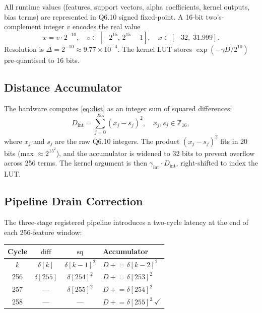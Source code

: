 \documentclass[11pt]{article}
\begin{document}
All runtime values (features, support vectors, alpha coefficients, kernel
outputs, bias terms) are represented in Q6.10 signed fixed-point.  A 16-bit
two's-complement integer $v$ encodes the real value
\begin{equation}
  x = v \cdot 2^{-10},
  \quad v \in [-2^{15},\,2^{15}-1],
  \quad x \in [-32,\;31.999].
  \label{eq:q6_10}
\end{equation}
Resolution is $\Delta = 2^{-10} \approx 9.77\times10^{-4}$.  The kernel LUT
stores $\exp(-\gamma D / 2^{10})$ pre-quantised to 16 bits.

\subsection{Distance Accumulator}

The hardware computes \eqref{eq:dist} as an integer sum of squared differences:
\begin{equation}
  D_{\mathrm{int}} = \sum_{j=0}^{255}(x_j - s_j)^2,
  \quad x_j, s_j \in \mathbb{Z}_{16},
  \label{eq:dist_int}
\end{equation}
where $x_j$ and $s_j$ are the raw Q6.10 integers.  The product $(x_j-s_j)^2$
fits in 20 bits (max $\approx 2^{15^2}$), and the accumulator is widened to
32 bits to prevent overflow across 256 terms.  The kernel argument is then
$\gamma_{\mathrm{int}} \cdot D_{\mathrm{int}}$, right-shifted to index the LUT.

\subsection{Pipeline Drain Correction}

The three-stage registered pipeline introduces a two-cycle latency at the end of
each 256-feature window:

\begin{center}
\begin{tabular}{cccl}
\toprule
Cycle & $\text{diff}$ & $\text{sq}$ & Accumulator \\
\midrule
$k$   & $\delta[k]$   & $\delta[k{-}1]^2$   & $D \mathrel{+}= \delta[k{-}2]^2$ \\
256   & $\delta[255]$  & $\delta[254]^2$      & $D \mathrel{+}= \delta[253]^2$ \\
257   & ---            & $\delta[255]^2$      & $D \mathrel{+}= \delta[254]^2$ \\
258   & ---            & ---                  & $D \mathrel{+}= \delta[255]^2\;\checkmark$ \\
\bottomrule
\end{tabular}
\end{center}
\end{document}
